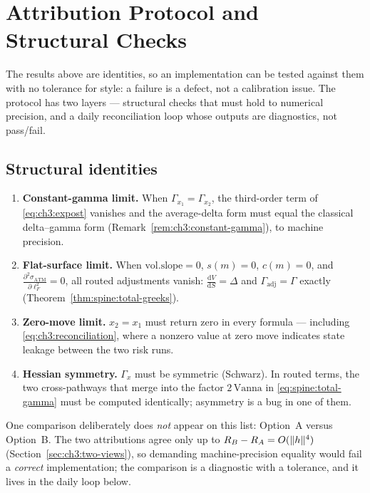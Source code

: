 \documentclass[11pt]{book}
\theoremstyle{plain}
\theoremstyle{definition}
\theoremstyle{remark}
\newcommand{\mln}{m}                             %
\newcommand{\lF}{\ell_F}                         %
\newcommand{\satm}{\sigma_{\mathrm{ATM}}}        %
\newcommand{\volslope}{\mathrm{vol.slope}}       %
\newcommand{\Vanna}{\mathrm{Vanna}}
\newcommand{\Gadj}{\Gamma_{\mathrm{adj}}}        %
\newcommand{\dd}{\mathrm{d}}                                  %
\newcommand{\pdd}[2]{\frac{\partial^2 #1}{\partial #2^2}}     %
\newcommand{\td}[2]{\frac{\dd #1}{\dd #2}}                    %
\DeclarePairedDelimiter{\norm}{\lVert}{\rVert}
\begin{document}
\section{Attribution Protocol and Structural Checks}\label{sec:ch3:protocol}

The results above are identities, so an implementation can be tested against
them with no tolerance for style: a failure is a defect, not a calibration
issue. The protocol has two layers --- structural checks that must hold to
numerical precision, and a daily reconciliation loop whose outputs are
diagnostics, not pass/fail.

\subsection{Structural identities}\label{sec:ch3:structural}

\begin{enumerate}
  \item \textbf{Constant-gamma limit.} When $\Gamma_{x_1} = \Gamma_{x_2}$,
        the third-order term of \eqref{eq:ch3:expost} vanishes and the
        average-delta form must equal the classical delta--gamma form
        (Remark~\ref{rem:ch3:constant-gamma}), to machine precision.
  \item \textbf{Flat-surface limit.} When $\volslope = 0$, $s(\mln) = 0$,
        $c(\mln) = 0$, and $\pdd{\satm}{\lF} = 0$, all routed adjustments
        vanish: $\td{V}{S} = \Delta$ and $\Gadj = \Gamma$ exactly
        (Theorem~\ref{thm:spine:total-greeks}).
  \item \textbf{Zero-move limit.} $x_2 = x_1$ must return zero in every
        formula --- including \eqref{eq:ch3:reconciliation}, where a nonzero
        value at zero move indicates state leakage between the two risk runs.
  \item \textbf{Hessian symmetry.} $\Gamma_x$ must be symmetric (Schwarz).
        In routed terms, the two cross-pathways that merge into the factor
        $2\,\Vanna$ in \eqref{eq:spine:total-gamma} must be computed
        identically; asymmetry is a bug in one of them.
\end{enumerate}

One comparison deliberately does \emph{not} appear on this list: Option~A
versus Option~B. The two attributions agree only up to
$R_B - R_A = O(\norm{h}^4)$ (Section~\ref{sec:ch3:two-views}), so demanding
machine-precision equality would fail a \emph{correct} implementation; the
comparison is a diagnostic with a tolerance, and it lives in the daily loop
below.
\end{document}
